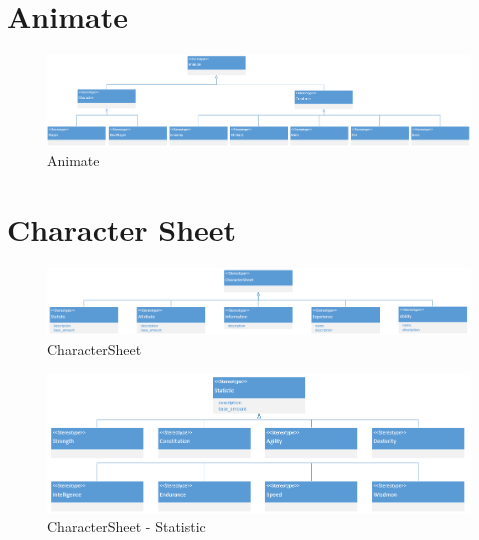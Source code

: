 \section{Animate}
\begin{figure}
    \begin{center}
    \includegraphics[width=20cm]{10_img/Z_annexeA/animate.PNG} 
    \caption{Animate}
    \label{A-Animate}
    \end{center}
\end{figure}



\section{Character Sheet} 
\begin{figure}
    \begin{center}
    \includegraphics[width=20cm]{10_img/Z_annexeA/cs_racine.PNG} 
    \caption{CharacterSheet}
    \label{A-CS}
    \end{center}
\end{figure}

\begin{figure}
    \begin{center}
    \includegraphics[width=20cm]{10_img/Z_annexeA/cs_statistic.PNG} 
    \caption{CharacterSheet - Statistic}
    \label{A-Statistic}
    \end{center}
\end{figure}


